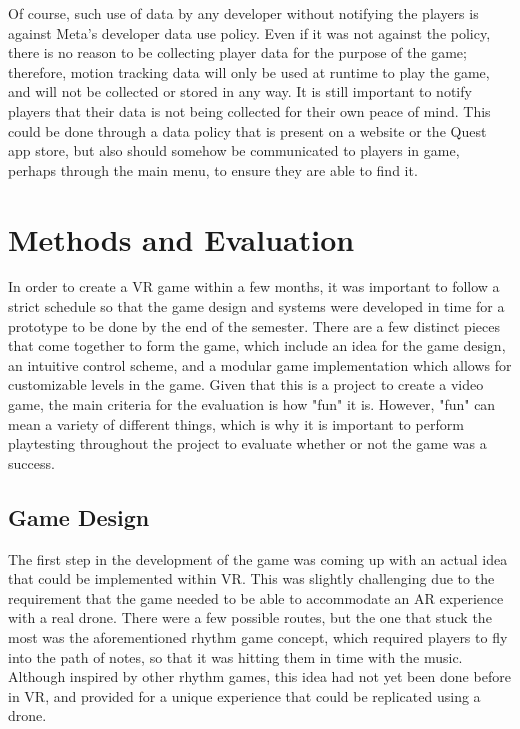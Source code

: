 \documentclass[10pt,twocolumn]{article}
\begin{document}
Of course, such use of data by any developer without notifying the players is against Meta's developer data use policy\cite{MetaDevData}. Even if it was not against the policy, there is no reason to be collecting player data for the purpose of the game; therefore, motion tracking data will only be used at runtime to play the game, and will not be collected or stored in any way. It is still important to notify players that their data is not being collected for their own peace of mind. This could be done through a data policy that is present on a website or the Quest app store, but also should somehow be communicated to players in game, perhaps through the main menu, to ensure they are able to find it.

\section{Methods and Evaluation}
In order to create a VR game within a few months, it was important to follow a strict schedule so that the game design and systems were developed in time for a prototype to be done by the end of the semester. There are a few distinct pieces that come together to form the game, which include an idea for the game design, an intuitive control scheme, and a modular game implementation which allows for customizable levels in the game. Given that this is a project to create a video game, the main criteria for the evaluation is how "fun" it is. However, "fun" can mean a variety of different things, which is why it is important to perform playtesting throughout the project to evaluate whether or not the game was a success. 

\subsection{Game Design}
The first step in the development of the game was coming up with an actual idea that could be implemented within VR. This was slightly challenging due to the requirement that the game needed to be able to accommodate an AR experience with a real drone. There were a few possible routes, but the one that stuck the most was the aforementioned rhythm game concept, which required players to fly into the path of notes, so that it was hitting them in time with the music. Although inspired by other rhythm games, this idea had not yet been done before in VR, and provided for a unique experience that could be replicated using a drone.
\end{document}
